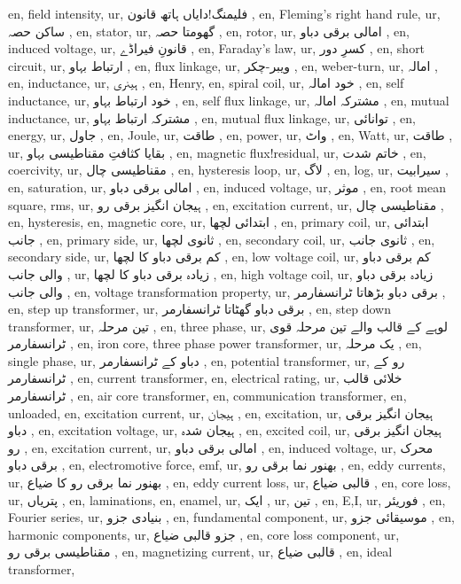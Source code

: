 en, field intensity,
ur, فلیمنگ!دایاں ہاتھ قانون ,
en, Fleming's right hand rule,
ur, ساکن حصہ ,
en, stator,
ur, گھومتا حصہ ,
en, rotor,
ur, امالی برقی دباو ,
en, induced voltage,
ur, قانونِ فیراڈے ,
en, Faraday's law,
ur, کسرِ دور ,
en, short circuit,
ur, ارتباط بہاو ,
en, flux linkage,
ur, ویبر-چکر ,
en, weber-turn,
ur, امالہ ,
en, inductance,
ur, ہینری ,
en, Henry,
en, spiral coil,
ur, خود امالہ ,
en, self inductance,
ur, خود ارتباط بہاو ,
en, self flux linkage,
ur, مشترکہ امالہ ,
en, mutual inductance,
ur, مشترکہ ارتباط بہاو ,
en, mutual flux linkage,
ur, توانائی ,
en, energy,
ur, جاول ,
en, Joule,
ur, طاقت ,
en, power,
ur, واٹ ,
en, Watt,
ur, طاقت ,
ur, بقایا کثافتِ مقناطیسی بہاو ,
en, magnetic flux!residual,
ur, خاتم شدت ,
en, coercivity,
ur, مقناطیسی چال ,
en, hysteresis loop,
ur, لاگ ,
en, log,
ur, سیرابیت ,
en, saturation,
ur, امالی برقی دباو ,
en, induced voltage,
ur, موثر ,
en, root mean square, rms,
ur, ہیجان انگیز برقی رو ,
en, excitation current,
ur, مقناطیسی چال ,
en, hysteresis,
en, magnetic core,
ur, ابتدائی لچھا ,
en, primary coil,
ur, ابتدائی جانب ,
en, primary side,
ur, ثانوی لچھا ,
en, secondary coil,
ur, ثانوی جانب ,
en, secondary side,
ur, کم برقی دباو کا لچھا ,
en, low voltage coil,
ur, کم برقی دباو والی جانب ,
ur, زیادہ برقی دباو کا لچھا ,
en, high voltage coil,
ur, زیادہ برقی دباو والی جانب ,
en, voltage transformation property,
ur, برقی دباو بڑھاتا ٹرانسفارمر ,
en, step up transformer,
ur, برقی دباو گھٹاتا ٹرانسفارمر ,
en, step down transformer,
ur, تین مرحلہ ,
en, three phase,
ur, لوہے کے قالب والے تین مرحلہ قوی ٹرانسفارمر ,
en, iron core, three phase power transformer,
ur, یک مرحلہ ,
en, single phase,
ur, دباو کے ٹرانسفارمر ,
en, potential transformer,
ur, رو کے ٹرانسفارمر ,
en, current transformer,
en, electrical rating,
ur, خلائی قالب ٹرانسفارمر ,
en, air core transformer,
en, communication transformer,
en, unloaded,
en, excitation current,
ur, ہیجان ,
en, excitation,
ur, ہیجان انگیز برقی دباو ,
en, excitation voltage,
ur, ہیجان شدہ ,
en, excited coil,
ur, ہیجان انگیز برقی رو ,
en, excitation current,
ur, امالی برقی دباو ,
en, induced voltage,
ur, محرک برقی دباو ,
en, electromotive force, emf,
ur, بھنور نما برقی رو ,
en, eddy currents,
ur, بھنور نما برقی رو کا ضیاع ,
en, eddy current loss,
ur, قالبی ضیاع ,
en, core loss,
ur, پتریاں ,
en, laminations,
en, enamel,
ur, ایک ,
ur, تین ,
en, E,I,
ur, فوریئر ,
en, Fourier series,
ur, بنیادی جزو ,
en, fundamental component,
ur, موسیقائی جزو ,
en, harmonic components,
ur, جزو قالبی ضیاع ,
en, core loss component,
ur, مقناطیسی برقی رو ,
en, magnetizing current,
ur, قالبی ضیاع ,
en, ideal transformer,
